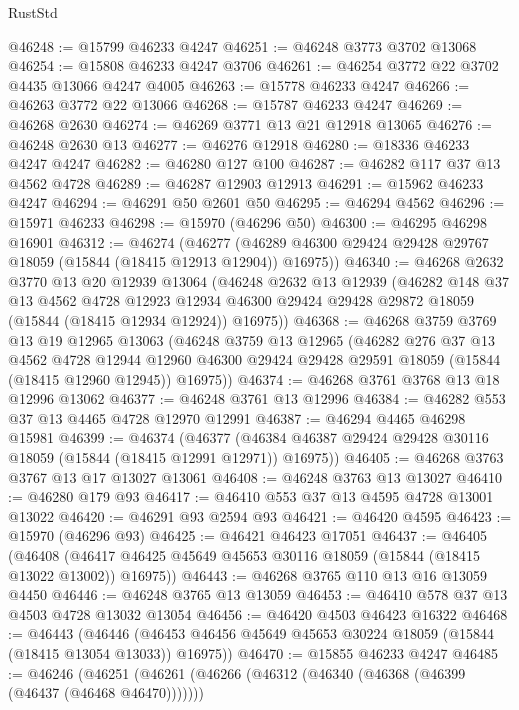 \begin{lexlean}{RustStd}
\begin{coremodule}
@46248 := @15799 @46233 @4247
@46251 := @46248 @3773 @3702 @13068
@46254 := @15808 @46233 @4247 @3706
@46261 := @46254 @3772 @22 @3702 @4435 @13066 @4247 @4005
@46263 := @15778 @46233 @4247
@46266 := @46263 @3772 @22 @13066
@46268 := @15787 @46233 @4247
@46269 := @46268 @2630
@46274 := @46269 @3771 @13 @21 @12918 @13065
@46276 := @46248 @2630 @13
@46277 := @46276 @12918
@46280 := @18336 @46233 @4247 @4247
@46282 := @46280 @127 @100
@46287 := @46282 @117 @37 @13 @4562 @4728
@46289 := @46287 @12903 @12913
@46291 := @15962 @46233 @4247
@46294 := @46291 @50 @2601 @50
@46295 := @46294 @4562
@46296 := @15971 @46233
@46298 := @15970 (@46296 @50)
@46300 := @46295 @46298 @16901
@46312 := @46274
    (@46277 (@46289 @46300 @29424 @29428 @29767 @18059 (@15844 (@18415 @12913 @12904)) @16975))
@46340 := @46268
    @2632
    @3770
    @13
    @20
    @12939
    @13064
    (@46248
      @2632
      @13
      @12939
      (@46282
        @148
        @37
        @13
        @4562
        @4728
        @12923
        @12934
        @46300
        @29424
        @29428
        @29872
        @18059
        (@15844 (@18415 @12934 @12924))
        @16975))
@46368 := @46268
    @3759
    @3769
    @13
    @19
    @12965
    @13063
    (@46248
      @3759
      @13
      @12965
      (@46282
        @276
        @37
        @13
        @4562
        @4728
        @12944
        @12960
        @46300
        @29424
        @29428
        @29591
        @18059
        (@15844 (@18415 @12960 @12945))
        @16975))
@46374 := @46268 @3761 @3768 @13 @18 @12996 @13062
@46377 := @46248 @3761 @13 @12996
@46384 := @46282 @553 @37 @13 @4465 @4728 @12970 @12991
@46387 := @46294 @4465 @46298 @15981
@46399 := @46374
    (@46377 (@46384 @46387 @29424 @29428 @30116 @18059 (@15844 (@18415 @12991 @12971)) @16975))
@46405 := @46268 @3763 @3767 @13 @17 @13027 @13061
@46408 := @46248 @3763 @13 @13027
@46410 := @46280 @179 @93
@46417 := @46410 @553 @37 @13 @4595 @4728 @13001 @13022
@46420 := @46291 @93 @2594 @93
@46421 := @46420 @4595
@46423 := @15970 (@46296 @93)
@46425 := @46421 @46423 @17051
@46437 := @46405
    (@46408 (@46417 @46425 @45649 @45653 @30116 @18059 (@15844 (@18415 @13022 @13002)) @16975))
@46443 := @46268 @3765 @110 @13 @16 @13059 @4450
@46446 := @46248 @3765 @13 @13059
@46453 := @46410 @578 @37 @13 @4503 @4728 @13032 @13054
@46456 := @46420 @4503 @46423 @16322
@46468 := @46443
    (@46446 (@46453 @46456 @45649 @45653 @30224 @18059 (@15844 (@18415 @13054 @13033)) @16975))
@46470 := @15855 @46233 @4247
@46485 := @46246
    (@46251
      (@46261
        (@46266 (@46312 (@46340 (@46368 (@46399 (@46437 (@46468 @46470)))))))

\end{coremodule}
\end{lexlean}
